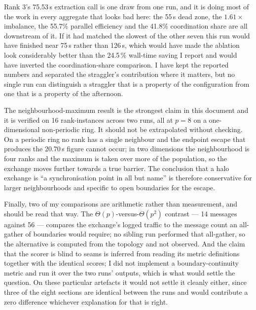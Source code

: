 \documentclass[11pt]{article}
\begin{document}
Rank 3's 75.53\,s extraction call is one draw from one run, and it is doing most of the work in every
aggregate that looks bad here: the 55\,s dead zone, the $1.61\times$ imbalance, the 55.7\% parallel
efficiency and the 41.8\% coordination share are all downstream of it. If it had matched the slowest
of the other seven this run would have finished near 75\,s rather than 126\,s, which would have made
the ablation look considerably better than the 24.5\,\% wall-time saving I report and would have
inverted the coordination-share comparison. I have kept the reported numbers and separated the
straggler's contribution where it matters, but no single run can distinguish a straggler that is a
property of the configuration from one that is a property of the afternoon.

The neighbourhood-maximum result is the strongest claim in this document and it is verified on 16
rank-instances across two runs, all at $p=8$ on a one-dimensional non-periodic ring. It should not be
extrapolated without checking. On a periodic ring no rank has a single neighbour and the endpoint
escape that produces the 20.70\,s figure cannot occur; in two dimensions the neighbourhood is four
ranks and the maximum is taken over more of the population, so the exchange moves further towards a
true barrier. The conclusion that a halo exchange is ``a synchronisation point in all but name'' is
therefore conservative for larger neighbourhoods and specific to open boundaries for the escape.

Finally, two of my comparisons are arithmetic rather than measurement, and should be read that way.
The $\Theta(p)$-versus-$\Theta(p^2)$ contrast --- 14 messages against 56 --- compares the exchange's
logged traffic to the message count an all-gather of boundaries would require; no sibling run
performed that all-gather, so the alternative is computed from the topology and not observed. And
the claim that the scorer is blind to seams is inferred from reading its metric definitions together
with the identical scores; I did not implement a boundary-continuity metric and run it over the two
runs' outputs, which is what would settle the question. On these particular artefacts it would not
settle it cleanly either, since three of the eight sections are identical between the runs and would
contribute a zero difference whichever explanation for that is right.
\end{document}
